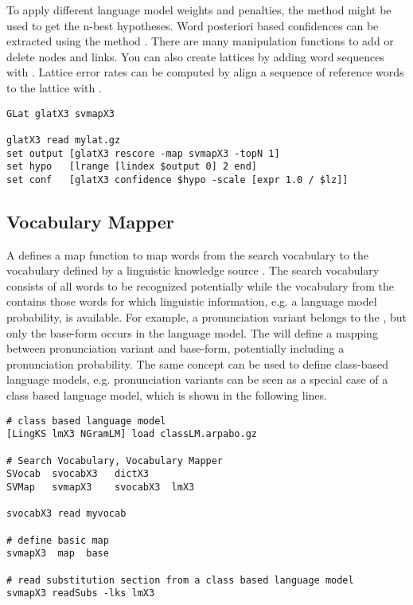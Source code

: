 To apply  different language model  weights and penalties,  the method
 might be used  to get the n-best hypotheses. Word
posteriori based    confidences  can be extracted    using  the method
. There are many  manipulation functions to add
or delete nodes and links. You can also create lattices by adding word
sequences  with  .   Lattice  error rates  can  be
computed by  align a sequence of reference  words to the  lattice with
.

\begin{verbatim}
GLat glatX3 svmapX3 

glatX3 read mylat.gz
set output [glatX3 rescore -map svmapX3 -topN 1]
set hypo   [lrange [lindex $output 0] 2 end]
set conf   [glatX3 confidence $hypo -scale [expr 1.0 / $lz]]
\end{verbatim}


\subsection{Vocabulary Mapper}

A  defines a  map function to  map words  from the
search vocabulary  to the vocabulary defined by a
linguistic knowledge     source .     The  search
vocabulary consists of all   words to be recognized  potentially while
the vocabulary from the  contains those words for
which  linguistic information, e.g.  a  language model probability, is
available.  For example,    a  pronunciation variant  belongs  to  the
, but only  the  base-form occurs in  the language
model. The      will  define   a mapping   between
pronunciation   variant  and    base-form,  potentially  including    a
pronunciation probability.   The  same concept  can  be used to define
class-based language models, e.g. pronunciation variants can be seen as
a special case of a class based language model, which  is shown in the
following lines.

\begin{verbatim}
# class based language model
[LingKS lmX3 NGramLM] load classLM.arpabo.gz

# Search Vocabulary, Vocabulary Mapper
SVocab  svocabX3   dictX3
SVMap   svmapX3    svocabX3  lmX3

svocabX3 read myvocab

# define basic map
svmapX3  map  base

# read substitution section from a class based language model
svmapX3 readSubs -lks lmX3
\end{verbatim}

